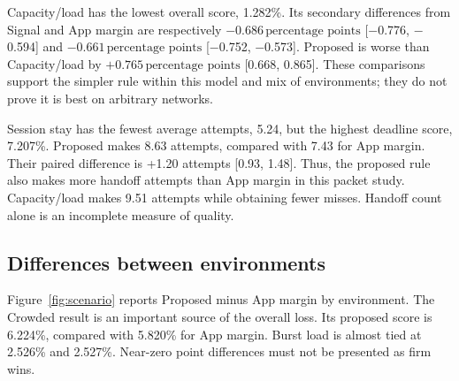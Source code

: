 \documentclass[11pt,a4paper]{article}
\newcommand{\pp}{\,\text{percentage points}}
\begin{document}
Capacity/load has the lowest overall score, 1.282\%. Its secondary differences from Signal and App margin are respectively $-0.686\pp$ [\ensuremath{-}0.776, \ensuremath{-}0.594] and $-0.661\pp$ [\ensuremath{-}0.752, \ensuremath{-}0.573]. Proposed is worse than Capacity/load by $+0.765\pp$ [0.668, 0.865]. These comparisons support the simpler rule within this model and mix of environments; they do not prove it is best on arbitrary networks.

Session stay has the fewest average attempts, 5.24, but the highest deadline score, 7.207\%. Proposed makes 8.63 attempts, compared with 7.43 for App margin. Their paired difference is +1.20 attempts [0.93, 1.48]. Thus, the proposed rule also makes more handoff attempts than App margin in this packet study. Capacity/load makes 9.51 attempts while obtaining fewer misses. Handoff count alone is an incomplete measure of quality.

\subsection{Differences between environments}
Figure~\ref{fig:scenario} reports Proposed minus App margin by environment. The Crowded result is an important source of the overall loss. Its proposed score is 6.224\%, compared with 5.820\% for App margin. Burst load is almost tied at 2.526\% and 2.527\%. Near-zero point differences must not be presented as firm wins.
\end{document}
